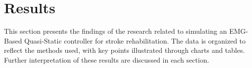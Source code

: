 \chapter{Results}
This section presents the findings of the research related to simulating an EMG-Based Quasi-Static controller for stroke rehabilitation. The data is organized to reflect the methods used, with key points illustrated through charts and tables. Further interpretation of these results are discussed in each section.

%
\newpage

\newpage



